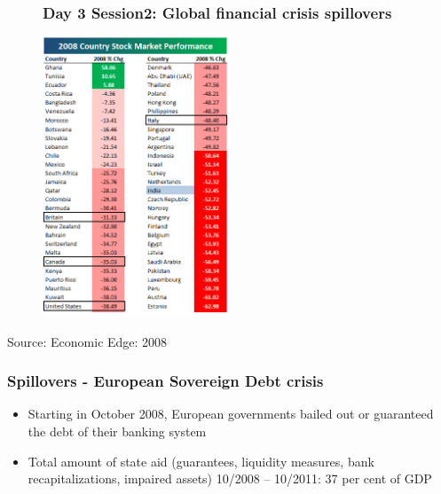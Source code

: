 \documentclass[11pt]{beamer}
\begin{document}
\begin{frame}
\begin{figure}
\frametitle{Day 3 Session2: Global financial crisis spillovers}
\includegraphics[width=0.5\textwidth]{Stockmarket2008.png}
\end{figure}
\tiny{Source: Economic Edge: 2008}
\end{frame}

\begin{frame}
\frametitle{Spillovers - European Sovereign Debt crisis}
\begin{itemize}
\item Starting in October 2008, European governments bailed out or guaranteed the debt of their banking system
\item Total amount of state aid (guarantees, liquidity measures, bank recapitalizations, impaired assets) 10/2008 – 10/2011: 37 per cent of GDP

\end{itemize}
\end{frame}
\end{document}
